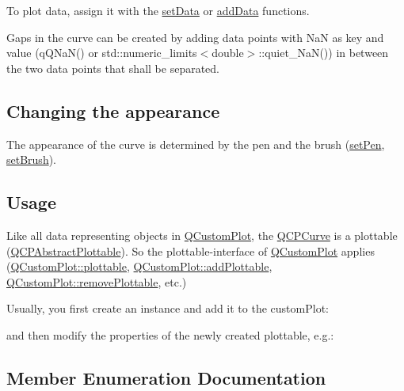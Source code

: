 To plot data, assign it with the \mbox{\hyperlink{class_q_c_p_curve_a631ac886708460013b30052f49cbc9da}{set\+Data}} or \mbox{\hyperlink{class_q_c_p_curve_a4e24023c3b9ac75440c7a260172c99af}{add\+Data}} functions.

Gaps in the curve can be created by adding data points with NaN as key and value ({\ttfamily q\+Q\+Na\+N()} or {\ttfamily std\+::numeric\+\_\+limits$<$double$>$\+::quiet\+\_\+\+Na\+N()}) in between the two data points that shall be separated.\hypertarget{class_q_c_p_statistical_box_appearance}{}\subsection{Changing the appearance}\label{class_q_c_p_statistical_box_appearance}
The appearance of the curve is determined by the pen and the brush (\mbox{\hyperlink{class_q_c_p_abstract_plottable_ab74b09ae4c0e7e13142fe4b5bf46cac7}{set\+Pen}}, \mbox{\hyperlink{class_q_c_p_abstract_plottable_a7a4b92144dca6453a1f0f210e27edc74}{set\+Brush}}). \hypertarget{class_q_c_p_statistical_box_usage}{}\subsection{Usage}\label{class_q_c_p_statistical_box_usage}
Like all data representing objects in \mbox{\hyperlink{class_q_custom_plot}{Q\+Custom\+Plot}}, the \mbox{\hyperlink{class_q_c_p_curve}{Q\+C\+P\+Curve}} is a plottable (\mbox{\hyperlink{class_q_c_p_abstract_plottable}{Q\+C\+P\+Abstract\+Plottable}}). So the plottable-\/interface of \mbox{\hyperlink{class_q_custom_plot}{Q\+Custom\+Plot}} applies (\mbox{\hyperlink{class_q_custom_plot_a32de81ff53e263e785b83b52ecd99d6f}{Q\+Custom\+Plot\+::plottable}}, \mbox{\hyperlink{class_q_custom_plot_ab7ad9174f701f9c6f64e378df77927a6}{Q\+Custom\+Plot\+::add\+Plottable}}, \mbox{\hyperlink{class_q_custom_plot_af3dafd56884208474f311d6226513ab2}{Q\+Custom\+Plot\+::remove\+Plottable}}, etc.)

Usually, you first create an instance and add it to the custom\+Plot\+: 
\begin{DoxyCodeInclude}
\end{DoxyCodeInclude}
and then modify the properties of the newly created plottable, e.\+g.\+: 
\begin{DoxyCodeInclude}
\end{DoxyCodeInclude}


\subsection{Member Enumeration Documentation}
\mbox{\label{class_q_c_p_curve_a2710e9f79302152cff794c6e16cc01f1}} 
